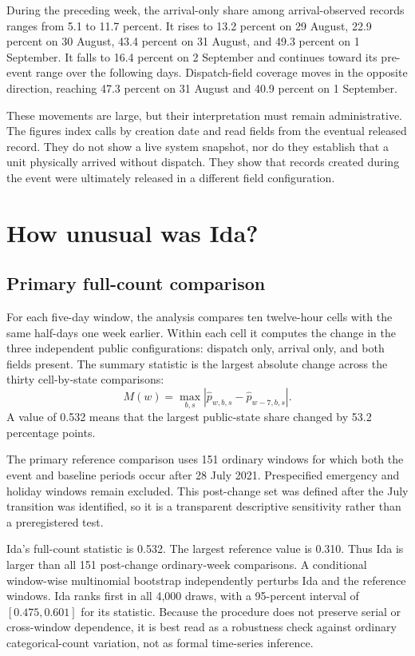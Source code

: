 \documentclass[11pt]{article}
\begin{document}
During the preceding week, the arrival-only share among arrival-observed records ranges from 5.1 to 11.7 percent. It rises to 13.2 percent on 29 August, 22.9 percent on 30 August, 43.4 percent on 31 August, and 49.3 percent on 1 September. It falls to 16.4 percent on 2 September and continues toward its pre-event range over the following days. Dispatch-field coverage moves in the opposite direction, reaching 47.3 percent on 31 August and 40.9 percent on 1 September.

These movements are large, but their interpretation must remain administrative. The figures index calls by creation date and read fields from the eventual released record. They do not show a live system snapshot, nor do they establish that a unit physically arrived without dispatch. They show that records created during the event were ultimately released in a different field configuration.

\section{How unusual was Ida?}

\subsection{Primary full-count comparison}

For each five-day window, the analysis compares ten twelve-hour cells with the same half-days one week earlier. Within each cell it computes the change in the three independent public configurations: dispatch only, arrival only, and both fields present. The summary statistic is the largest absolute change across the thirty cell-by-state comparisons:
\begin{equation}
M(w)=\max_{b,s}\left|\widehat p_{w,b,s}-\widehat p_{w-7,b,s}\right|.
\end{equation}
A value of 0.532 means that the largest public-state share changed by 53.2 percentage points.

The primary reference comparison uses 151 ordinary windows for which both the event and baseline periods occur after 28 July 2021. Prespecified emergency and holiday windows remain excluded. This post-change set was defined after the July transition was identified, so it is a transparent descriptive sensitivity rather than a preregistered test.

Ida's full-count statistic is 0.532. The largest reference value is 0.310. Thus Ida is larger than all 151 post-change ordinary-week comparisons. A conditional window-wise multinomial bootstrap independently perturbs Ida and the reference windows. Ida ranks first in all 4,000 draws, with a 95-percent interval of $[0.475,0.601]$ for its statistic. Because the procedure does not preserve serial or cross-window dependence, it is best read as a robustness check against ordinary categorical-count variation, not as formal time-series inference.
\end{document}
